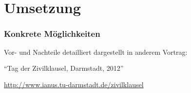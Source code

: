 \documentclass[presentation]{beamer}
\begin{document}
\section{Umsetzung}
\label{sec-7}
\begin{frame}
\frametitle{Konkrete Möglichkeiten}
\label{sec-7-1}

Vor- und Nachteile detailliert dargestellt in anderem Vortrag:

``Tag der Zivilklausel, Darmstadt, 2012''

\href{http://www.ianus.tu-darmstadt.de/zivilklausel}{http://www.ianus.tu-darmstadt.de/zivilklausel}
\end{frame}
\end{document}
